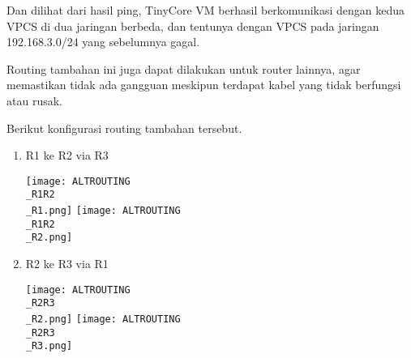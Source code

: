 \documentclass[12pt, a4paper]{article}
\begin{document}
  Dan dilihat dari hasil ping, TinyCore VM berhasil berkomunikasi dengan
  kedua VPCS di dua jaringan berbeda, dan tentunya dengan VPCS pada
  jaringan 192.168.3.0/24 yang sebelumnya gagal.

  Routing tambahan ini juga dapat dilakukan untuk router lainnya,
  agar memastikan tidak ada gangguan meskipun terdapat kabel yang tidak
  berfungsi atau rusak.

  Berikut konfigurasi routing tambahan tersebut.

  \begin{enumerate}

    \item R1 ke R2 via R3
      \begin{center}
        \texttt{[image: ALTROUTING\\\_R1R2\\\_R1.png]}
        \texttt{[image: ALTROUTING\\\_R1R2\\\_R2.png]}
      \end{center}

    \item R2 ke R3 via R1
      \begin{center}
        \texttt{[image: ALTROUTING\\\_R2R3\\\_R2.png]}
        \texttt{[image: ALTROUTING\\\_R2R3\\\_R3.png]}
      \end{center}

  \end{enumerate}
\end{document}
